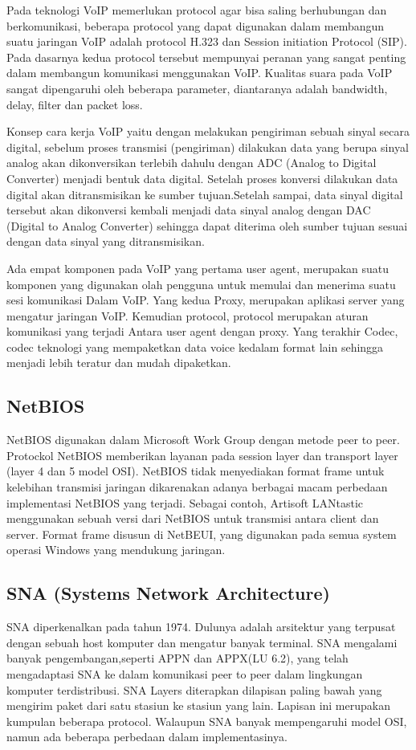 \documentclass{article}
\begin{document}
Pada teknologi VoIP memerlukan protocol agar bisa saling berhubungan dan berkomunikasi, beberapa protocol yang dapat digunakan dalam 
membangun suatu jaringan VoIP adalah protocol H.323 dan Session initiation Protocol (SIP). Pada dasarnya kedua protocol tersebut 
mempunyai peranan yang sangat penting dalam membangun komunikasi menggunakan VoIP. Kualitas suara pada VoIP sangat dipengaruhi oleh 
beberapa parameter, diantaranya adalah bandwidth, delay, filter dan packet loss.

Konsep cara kerja VoIP yaitu dengan melakukan pengiriman sebuah sinyal secara digital, sebelum proses transmisi (pengiriman) dilakukan 
data yang berupa sinyal analog akan dikonversikan terlebih dahulu dengan ADC (Analog to Digital Converter) menjadi bentuk data digital. 
Setelah proses konversi dilakukan data digital akan ditransmisikan ke sumber tujuan.Setelah sampai, data sinyal digital tersebut akan 
dikonversi kembali menjadi data sinyal analog dengan DAC (Digital to Analog Converter) sehingga dapat diterima oleh sumber tujuan 
sesuai dengan data sinyal yang ditransmisikan.

Ada empat komponen pada VoIP yang pertama user agent, merupakan suatu komponen yang digunakan olah pengguna untuk memulai dan menerima 
suatu sesi komunikasi Dalam VoIP. Yang kedua Proxy, merupakan aplikasi server yang mengatur jaringan VoIP. Kemudian protocol, protocol 
merupakan aturan komunikasi yang terjadi Antara user agent dengan proxy. Yang terakhir Codec, codec teknologi yang mempaketkan data 
voice kedalam format lain sehingga menjadi lebih teratur dan mudah dipaketkan.

\subsection{NetBIOS}
NetBIOS digunakan dalam Microsoft Work Group dengan metode peer to peer. Protockol NetBIOS memberikan layanan pada session layer dan 
transport layer (layer 4 dan 5 model OSI). NetBIOS tidak menyediakan format frame untuk kelebihan transmisi jaringan dikarenakan adanya 
berbagai macam perbedaan implementasi NetBIOS yang terjadi. Sebagai contoh, Artisoft LANtastic menggunakan sebuah versi dari NetBIOS 
untuk transmisi antara client dan server. Format frame disusun di NetBEUI, yang digunakan pada semua system operasi Windows yang 
mendukung jaringan.

\subsection{SNA (Systems Network Architecture)}
SNA diperkenalkan pada tahun 1974. Dulunya adalah arsitektur yang terpusat dengan sebuah host komputer dan mengatur banyak terminal. 
SNA mengalami banyak pengembangan,seperti APPN dan APPX(LU 6.2), yang telah mengadaptasi SNA ke dalam komunikasi peer to peer dalam 
lingkungan komputer terdistribusi. SNA Layers diterapkan dilapisan paling bawah yang mengirim paket dari satu stasiun ke stasiun yang 
lain. Lapisan ini merupakan kumpulan beberapa protocol. Walaupun SNA banyak mempengaruhi model OSI, namun ada beberapa perbedaan dalam 
implementasinya.
\end{document}
